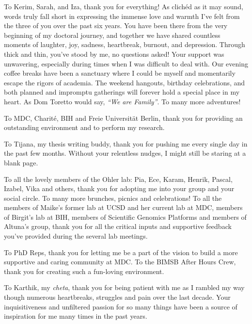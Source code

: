 \begin{acknowledgements}
\par To Kerim, Sarah, and Iza, thank you for everything! As clichéd as it may sound, words truly fall short in expressing the immense love and warmth I've felt from the three of you over the past six years. You have been there from the very beginning of my doctoral journey, and together we have shared countless moments of laughter, joy, sadness, heartbreak, burnout, and depression. Through thick and thin, you've stood by me, no questions asked! Your support was unwavering, especially during times when I was difficult to deal with. Our evening coffee breaks have been a sanctuary where I could be myself and momentarily escape the rigors of academia. The weekend hangouts, birthday celebrations, and both planned and impromptu gatherings will forever hold a special place in my heart. As Dom Toretto would say, \textit{``We are Family''}. To many more adventures!\\


\par To MDC, Charité, BIH and Freie Universität Berlin, thank you for providing an outstanding environment and to perform my research.\\

\par To Tijana, my thesis writing buddy, thank you for pushing me every single day in the past few months. Without your relentless nudges, I might still be staring at a blank page.\\

\par To all the lovely members of the Ohler lab: Pia, Ece, Karam, Henrik, Pascal, Izabel, Vika and others, thank you for adopting me into your group and your social circle. To many more brunches, picnics and celebrations! To all the members of Maike's former lab at UCSD and her current lab at MDC, members of Birgit's lab at BIH, members of Scientific Genomics Platforms and members of Altuna's group, thank you for all the critical inputs and supportive feedback you've provided during the several lab meetings.\\

\par To PhD Reps, thank you for letting me be a part of the vision to build a more supportive and caring community at MDC. To the BIMSB After Hours Crew, thank you for creating such a fun-loving environment.\\

\par To Karthik, my \textit{cheta}, thank you for being patient with me as I rambled my way though numerous heartbreaks, struggles and pain over the last decade. Your inquisitiveness and unfiltered passion for so many things have been a source of inspiration for me many times in the past years.\\


\end{acknowledgements}
